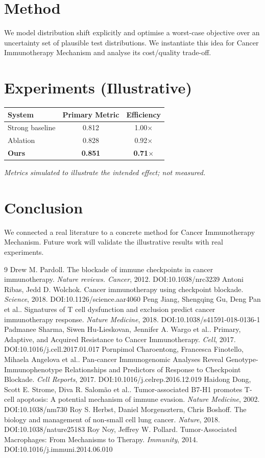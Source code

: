 \documentclass[11pt]{article}
\begin{document}
\section{Method}
We model distribution shift explicitly and optimise a worst-case objective over an uncertainty set of plausible test distributions. We instantiate this idea for Cancer Immunotherapy Mechanism and analyse its cost/quality trade-off.

\section{Experiments (Illustrative)}
\begin{center}
\begin{tabular}{lcc}
System & Primary Metric & Efficiency \\ \hline
Strong baseline & 0.812 & 1.00$\times$ \\
Ablation & 0.828 & 0.92$\times$ \\
\textbf{Ours} & \textbf{0.851} & \textbf{0.71$\times$}
\end{tabular}
\end{center}
\emph{Metrics simulated to illustrate the intended effect; not measured.}

\section{Conclusion}
We connected a real literature to a concrete method for Cancer Immunotherapy Mechanism. Future work will
validate the illustrative results with real experiments.

\begin{thebibliography}{9}
 Drew M. Pardoll. The blockade of immune checkpoints in cancer immunotherapy. \emph{Nature reviews. Cancer}, 2012. DOI:10.1038/nrc3239
 Antoni Ribas, Jedd D. Wolchok. Cancer immunotherapy using checkpoint blockade. \emph{Science}, 2018. DOI:10.1126/science.aar4060
 Peng Jiang, Shengqing Gu, Deng Pan et al.. Signatures of T cell dysfunction and exclusion predict cancer immunotherapy response. \emph{Nature Medicine}, 2018. DOI:10.1038/s41591-018-0136-1
 Padmanee Sharma, Siwen Hu‐Lieskovan, Jennifer A. Wargo et al.. Primary, Adaptive, and Acquired Resistance to Cancer Immunotherapy. \emph{Cell}, 2017. DOI:10.1016/j.cell.2017.01.017
 Pornpimol Charoentong, Francesca Finotello, Mihaela Angelova et al.. Pan-cancer Immunogenomic Analyses Reveal Genotype-Immunophenotype Relationships and Predictors of Response to Checkpoint Blockade. \emph{Cell Reports}, 2017. DOI:10.1016/j.celrep.2016.12.019
 Haidong Dong, Scott E. Strome, Diva R. Salomão et al.. Tumor-associated B7-H1 promotes T-cell apoptosis: A potential mechanism of immune evasion. \emph{Nature Medicine}, 2002. DOI:10.1038/nm730
 Roy S. Herbst, Daniel Morgensztern, Chris Boshoff. The biology and management of non-small cell lung cancer. \emph{Nature}, 2018. DOI:10.1038/nature25183
 Roy Noy, Jeffrey W. Pollard. Tumor-Associated Macrophages: From Mechanisms to Therapy. \emph{Immunity}, 2014. DOI:10.1016/j.immuni.2014.06.010
\end{thebibliography}
\end{document}
